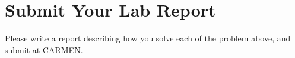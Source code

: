 \documentclass[11pt]{article}
\begin{document}


 

  


\section{Submit Your Lab Report}
\label{deliver}
Please write a report describing how you solve each of the problem above, and submit at CARMEN.
\end{document}
